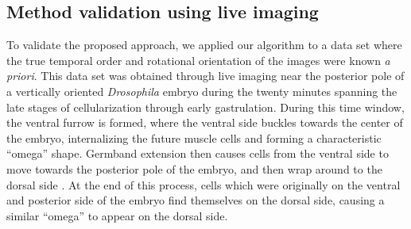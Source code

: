 \documentclass{pnastwo}
\makeatletter
\newcommand{\customlabel}[2]{%
\protected@write \@auxout {}{\string \newlabel {#1}{{#2}{}}}}
\makeatother
\begin{document}
\begin{article}


\subsection{Method validation using live imaging}

To validate the proposed approach, we applied our algorithm to a data set where the true temporal order and rotational orientation of the images were known {\em a priori}.
%
This data set was obtained through live imaging near the posterior pole of a vertically oriented {\it Drosophila} embryo during the twenty minutes spanning the late stages of cellularization through early gastrulation.
%
During this time window, the ventral furrow is formed, where the ventral side buckles towards the center of the embryo, internalizing the future muscle cells and forming a characteristic ``omega'' shape.
%
Germband extension then causes cells from the ventral side to move towards the posterior pole of the embryo, and then wrap around to the dorsal side \cite{leptin2005gastrulation}.
%
At the end of this process, cells which were originally on the ventral and posterior side of the embryo find themselves on the dorsal side, causing a similar ``omega'' to appear on the dorsal side.


\end{article}
\end{document}
